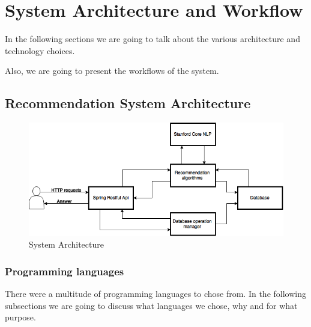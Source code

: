 \chapter{System Architecture and Workflow}
\label{chapter:system-architecture}

In the following sections we are going to talk about the various architecture and technology choices.

Also, we are going to present the workflows of the system.

\section{Recommendation System Architecture} 
\label{sec:architecture}

\begin{figure}[h]
\caption{System Architecture}
\includegraphics[width=1.0\textwidth]{src/img/architecture.png}
\end{figure}

\subsection{Programming languages}
\label{sec:programming-languages}
There were a multitude of programming languages to chose from.
In the following subsections we are going to discuss what languages we chose, why and for what purpose.

